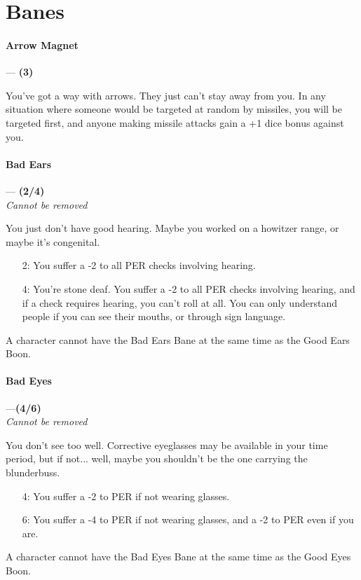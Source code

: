 \documentclass[oneside,11pt,english]{book}
\begin{document}
\section{Banes}
\paragraph{\label{bane:Arrow Magnet}Arrow Magnet}---\quad\textbf{ (3)}\par
You've got a way with arrows. They just can't stay away from you. In any situation where someone would 
be targeted at random by missiles, you will be targeted first, and anyone making missile attacks gain a +1 dice bonus against you. 
\paragraph{\label{bane:Bad Ears}Bad Ears}---\quad\textbf{ (2/4)}\\
\textit{Cannot be removed}\par
You just don't have good hearing. Maybe you worked on a howitzer range, or maybe it's congenital. 
\begin{itemize}
\item [2:] You suffer a -2 to all PER checks involving hearing. 
\item [4:] You're stone deaf. You suffer a -2 to all PER checks involving hearing, and if a check requires hearing, 
  you can't roll at all. You can only understand people if you can see their mouths, or through sign 
  language. 
\end{itemize}
A character cannot have the Bad Ears Bane at the same time as the Good Ears Boon. 
\paragraph{\label{bane:Bad Eyes}Bad Eyes}---\quad\textbf{(4/6)}\\
\textit{Cannot be removed}\par
You don't see too well. Corrective eyeglasses may be available in your time period, but if not... well, 
maybe you shouldn't be the one carrying the blunderbuss. 
\begin{itemize}
\item [4:] You suffer a -2 to PER if not wearing glasses. 
\item [6:] You suffer a -4 to PER if not wearing glasses, and a -2 to PER even if you are. 
\end{itemize}
A character cannot have the Bad Eyes Bane at the same time as the Good Eyes Boon. 
\end{document}
